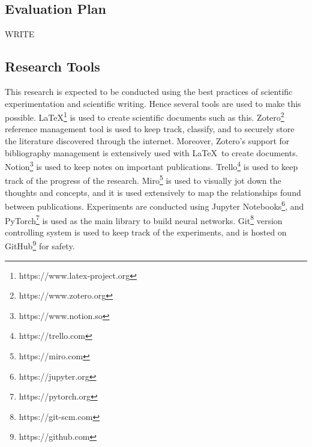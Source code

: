 \documentclass[../main.tex]{subfiles}
\begin{document}
\subsection{Evaluation Plan}
WRITE 

\subsection{Research Tools}
This research is expected to be conducted using the best practices of scientific experimentation and scientific writing. Hence several tools are used to make this possible. \LaTeX\footnote{https://www.latex-project.org} is used to create scientific documents such as this. Zotero\footnote{https://www.zotero.org} reference management tool is used to keep track, classify, and to securely store the literature discovered through the internet. Moreover, Zotero's support for bibliography management is extensively used with \LaTeX\ to create documents. Notion\footnote{https://www.notion.so} is used to keep notes on important publications. Trello\footnote{https://trello.com} is used to keep track of the progress of the research. Miro\footnote{https://miro.com} is used to visually jot down the thoughts and concepts, and it is used extensively to map the relationships found between publications. Experiments are conducted using Jupyter Notebooks\footnote{https://jupyter.org}, and PyTorch\footnote{https://pytorch.org} is used as the main library to build neural networks. Git\footnote{https://git-scm.com} version controlling system is used to keep track of the experiments, and is hosted on GitHub\footnote{https://github.com} for safety.
\end{document}
